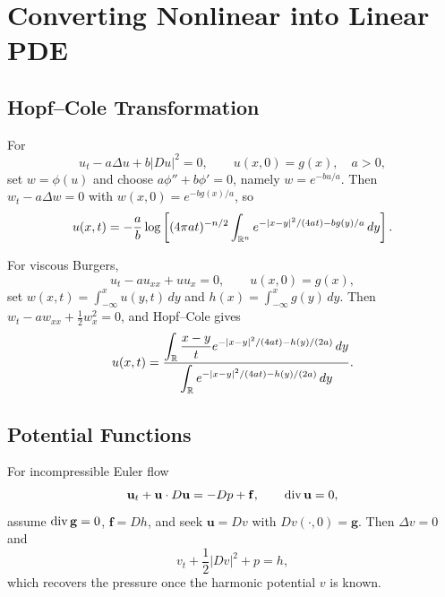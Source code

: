 \section{Converting Nonlinear into Linear PDE}
\label{sec:converting-nonlinear-into-linear-pde}

\subsection{Hopf--Cole Transformation}
\label{sec:hopf-cole-transformation}

\begin{example}
\label{ex:hopf-cole-quadratic-nonlinearity}

For
\[
u_t-a\Delta u+b|Du|^2=0,\qquad u(x,0)=g(x),\quad a>0,
\]
set $w=\phi(u)$ and choose $a\phi''+b\phi'=0$, namely
$w=e^{-bu/a}$. Then $w_t-a\Delta w=0$ with $w(x,0)=e^{-bg(x)/a}$, so
\[
u(x,t)=-\frac ab\log\left[(4\pi at)^{-n/2}
\int_{\mathbb{R}^n}e^{-|x-y|^2/(4at)-bg(y)/a}\,dy\right].
\]
\end{example}

\begin{example}
\label{ex:viscous-burgers-hopf-cole}

For viscous Burgers,
\[
u_t-au_{xx}+uu_x=0,\qquad u(x,0)=g(x),
\]
set $w(x,t)=\int_{-\infty}^xu(y,t)\,dy$ and
$h(x)=\int_{-\infty}^xg(y)\,dy$. Then
$w_t-aw_{xx}+\frac12w_x^2=0$, and Hopf--Cole gives
\[
u(x,t)=\frac{\displaystyle\int_{\mathbb{R}}\frac{x-y}{t}
e^{-|x-y|^2/(4at)-h(y)/(2a)}\,dy}
{\displaystyle\int_{\mathbb{R}} e^{-|x-y|^2/(4at)-h(y)/(2a)}\,dy}.
\]
\end{example}

\subsection{Potential Functions}
\label{sec:potential-functions}

\begin{example}
\label{ex:euler-equations-potential-function}
For incompressible Euler flow
\[
\mathbf u_t+\mathbf u\cdot D\mathbf u=-Dp+\mathbf f,\qquad
\operatorname{div}\mathbf u=0,
\]
assume $\operatorname{div}\mathbf g=0$, $\mathbf f=Dh$, and seek $\mathbf u=Dv$ with
$Dv(\cdot,0)=\mathbf g$. Then $\Delta v=0$ and
\[
v_t+\frac12|Dv|^2+p=h,
\]
which recovers the pressure once the harmonic potential $v$ is known.
\end{example}

